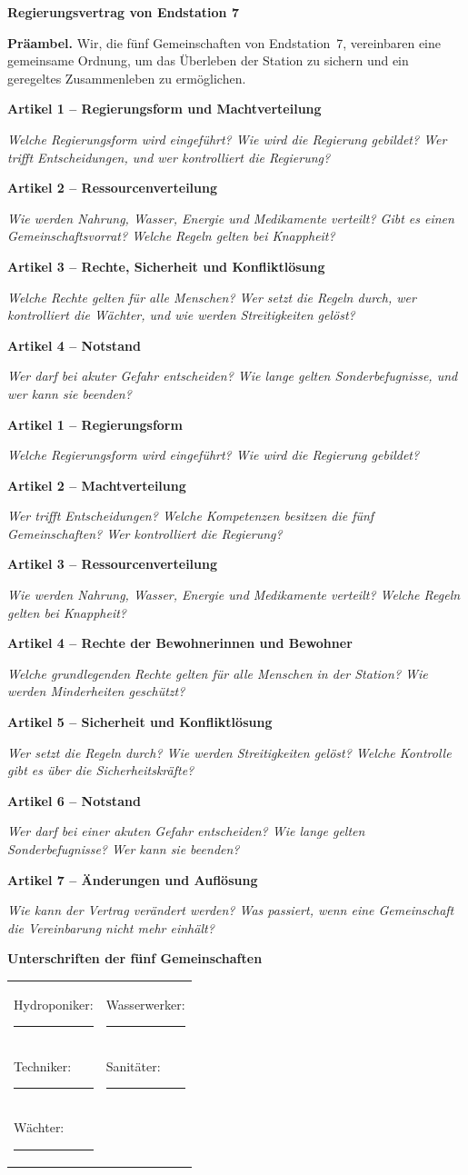 \newcommand{\artikel}[4]{%
\par\vspace{0.5mm}\noindent\textbf{Artikel #1 -- #2}\par\noindent\emph{#3}\linien{#4}}

\clearpage
\begin{center}
{\LARGE\bfseries Regierungsvertrag von Endstation 7}
\end{center}
\vspace{-1mm}
\noindent\textbf{Präambel.} Wir, die fünf Gemeinschaften von Endstation~7, vereinbaren eine gemeinsame Ordnung, um das Überleben der Station zu sichern und ein geregeltes Zusammenleben zu ermöglichen.

\ifkurz
\artikel{1}{Regierungsform und Machtverteilung}{Welche Regierungsform wird eingeführt? Wie wird die Regierung gebildet? Wer trifft Entscheidungen, und wer kontrolliert die Regierung?}{2}
\artikel{2}{Ressourcenverteilung}{Wie werden Nahrung, Wasser, Energie und Medikamente verteilt? Gibt es einen Gemeinschaftsvorrat? Welche Regeln gelten bei Knappheit?}{2}
\artikel{3}{Rechte, Sicherheit und Konfliktlösung}{Welche Rechte gelten für alle Menschen? Wer setzt die Regeln durch, wer kontrolliert die Wächter, und wie werden Streitigkeiten gelöst?}{2}
\artikel{4}{Notstand}{Wer darf bei akuter Gefahr entscheiden? Wie lange gelten Sonderbefugnisse, und wer kann sie beenden?}{2}
\else
\artikel{1}{Regierungsform}{Welche Regierungsform wird eingeführt? Wie wird die Regierung gebildet?}{3}
\artikel{2}{Machtverteilung}{Wer trifft Entscheidungen? Welche Kompetenzen besitzen die fünf Gemeinschaften? Wer kontrolliert die Regierung?}{2}
\artikel{3}{Ressourcenverteilung}{Wie werden Nahrung, Wasser, Energie und Medikamente verteilt? Welche Regeln gelten bei Knappheit?}{2}
\artikel{4}{Rechte der Bewohnerinnen und Bewohner}{Welche grundlegenden Rechte gelten für alle Menschen in der Station? Wie werden Minderheiten geschützt?}{2}
\clearpage
\artikel{5}{Sicherheit und Konfliktlösung}{Wer setzt die Regeln durch? Wie werden Streitigkeiten gelöst? Welche Kontrolle gibt es über die Sicherheitskräfte?}{3}
\artikel{6}{Notstand}{Wer darf bei einer akuten Gefahr entscheiden? Wie lange gelten Sonderbefugnisse? Wer kann sie beenden?}{3}
\artikel{7}{Änderungen und Auflösung}{Wie kann der Vertrag verändert werden? Was passiert, wenn eine Gemeinschaft die Vereinbarung nicht mehr einhält?}{3}
\fi

\vspace{2mm}\noindent\textbf{Unterschriften der fünf Gemeinschaften}\par\vspace{-1mm}
\renewcommand{\arraystretch}{1}
\noindent\begin{tabular}{@{}p{8.2cm}p{8.2cm}@{}}
\rule{0pt}{8mm}Hydroponiker: \rule{4.6cm}{0.4pt} & Wasserwerker: \rule{4.6cm}{0.4pt} \\
\rule{0pt}{8mm}Techniker: \rule{5.4cm}{0.4pt} & Sanitäter: \rule{5.4cm}{0.4pt} \\
\rule{0pt}{8mm}Wächter: \rule{5.1cm}{0.4pt} & \\
\end{tabular}
